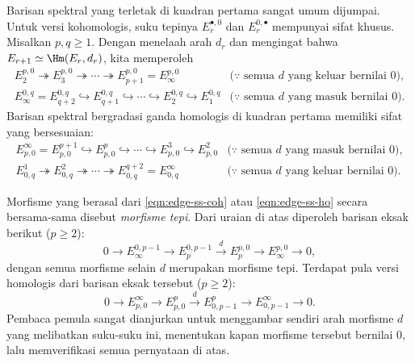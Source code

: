 \begin{remark}\label{rem:edge-computing}
	Barisan spektral yang terletak di kuadran pertama sangat umum dijumpai.
	Untuk versi kohomologis, suku tepinya $E_r^{\bullet,0}$ dan
	$E_r^{0,\bullet}$ mempunyai sifat khusus. Misalkan $p,q\geq1$. Dengan
	menelaah arah $d_r$ dan mengingat bahwa
	$E_{r+1}\simeq\Hm(E_r,d_r)$, kita memperoleh
	\begin{equation}\label{eqn:edge-ss-coh}\begin{array}{cc}
		E_2^{p,0}\twoheadrightarrow E_3^{p,0}\twoheadrightarrow\cdots
		\twoheadrightarrow E_{p+1}^{p,0}=E_\infty^{p,0}
		& \text{($\because$ semua $d$ yang keluar bernilai $0$)}, \\
		E_\infty^{0,q}=E_{q+2}^{0,q}\hookrightarrow E_{q+1}^{0,q}
		\hookrightarrow\cdots\hookrightarrow E_2^{0,q}\hookrightarrow E_1^{0,q}
		& \text{($\because$ semua $d$ yang masuk bernilai $0$)}.
	\end{array}\end{equation}
	Barisan spektral bergradasi ganda homologis di kuadran pertama memiliki
	sifat yang bersesuaian:
	\begin{equation}\label{eqn:edge-ss-ho}\begin{array}{cc}
		E^\infty_{p,0}=E^{p+1}_{p,0}\hookrightarrow E^p_{p,0}
		\hookrightarrow\cdots\hookrightarrow E^3_{p,0}\hookrightarrow E^2_{p,0}
		& \text{($\because$ semua $d$ yang masuk bernilai $0$)}, \\
		E^1_{0,q}\twoheadrightarrow E^2_{0,q}\twoheadrightarrow\cdots
		\twoheadrightarrow E^{q+2}_{0,q}=E^\infty_{0,q}
		& \text{($\because$ semua $d$ yang keluar bernilai $0$)}.
	\end{array}\end{equation}

	Morfisme yang berasal dari \eqref{eqn:edge-ss-coh} atau
	\eqref{eqn:edge-ss-ho} secara bersama-sama disebut \emph{morfisme tepi}.
	Dari uraian di atas diperoleh barisan eksak berikut ($p\geq2$):
	\begin{equation}\label{eqn:low-exact-coh}
		0\to E^{0,p-1}_\infty\to E^{0,p-1}_p\xrightarrow{d}E^{p,0}_p
		\to E^{p,0}_\infty\to0,
	\end{equation}
	dengan semua morfisme selain $d$ merupakan morfisme tepi. Terdapat pula
	versi homologis dari barisan eksak tersebut ($p\geq2$):
	\begin{equation}\label{eqn:low-exact-ho}
		0\to E^\infty_{p,0}\to E^p_{p,0}\xrightarrow{d}E^p_{0,p-1}
		\to E^\infty_{0,p-1}\to0.
	\end{equation}
	Pembaca pemula sangat dianjurkan untuk menggambar sendiri arah morfisme
	$d$ yang melibatkan suku-suku ini, menentukan kapan morfisme tersebut
	bernilai $0$, lalu memverifikasi semua pernyataan di atas.
\end{remark}
